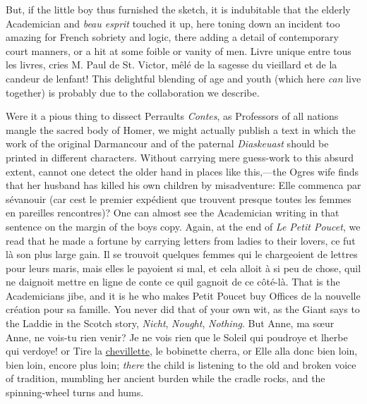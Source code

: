 \documentclass[14pt,a4paper]{memoir}
\newcommand{\ul}[1]{\uline{#1}}
\begin{document}
But, if the little boy thus furnished the sketch, it is indubitable that
the elderly Academician and \emph{beau esprit} touched it up, here
toning down an incident too amazing for French sobriety and logic, there
adding a detail of contemporary court manners, or a hit at some foible
or vanity of men. \textquotesingle Livre unique entre tous les
livres,\textquotesingle{} cries M. Paul de St. Victor,
\textquotesingle mêlé de la sagesse du vieillard et de la candeur de
l\textquotesingle enfant!\textquotesingle{} This delightful blending of
age and youth (which here \emph{can} \textquotesingle live
together\textquotesingle) is probably due to the collaboration we
describe.

Were it a pious thing to dissect Perrault\textquotesingle s
\emph{Contes}, as Professors of all nations mangle the sacred body of
Homer, we might actually publish a text in which the work of the
original Darmancour and of the paternal \emph{Diaskeuast} should be
printed in different characters. Without carrying mere guess-work to
this absurd extent, cannot one detect the older hand in places like
this,---the Ogre\textquotesingle s wife finds that her husband has
killed his own children by misadventure: \textquotesingle Elle commenca
par s\textquotesingle évanouir (car c\textquotesingle est le premier
expédient que trouvent presque toutes les femmes en pareilles
rencontres)\textquotesingle? One can almost see the Academician writing
in that sentence on the margin of the boy\textquotesingle s copy. Again,
at the end of \emph{Le Petit Poucet}, we read that he made a fortune by
carrying letters from ladies to their lovers, \textquotesingle ce fut là
son plus large gain. Il se trouvoit quelques femmes qui le chargeoient
de lettres pour leurs maris, mais elles le payoient si mal, et cela
alloit à si peu de chose, qu\textquotesingle il ne daignoit mettre en
ligne de conte ce qu\textquotesingle il gagnoit de ce
côté-là.\textquotesingle{} That is the Academician\textquotesingle s
jibe, and it is he who makes Petit Poucet buy Offices
\textquotesingle de la nouvelle création pour sa
famille.\textquotesingle{} \textquotesingle You never did that of your
own wit,\textquotesingle{} as the Giant says to the Laddie in the Scotch
story, \emph{Nicht}, \emph{Nought}, \emph{Nothing}. But
\textquotesingle Anne, ma sœur Anne, ne vois-tu rien
venir?\textquotesingle{} \textquotesingle Je ne vois rien que le Soleil
qui poudroye et l\textquotesingle herbe qui verdoye!\textquotesingle{}
or \textquotesingle Tire la \ul{chevillette}, le bobinette
cherra,\textquotesingle{} or \textquotesingle Elle alla donc bien loin,
bien loin, encore plus loin\textquotesingle; \emph{there} the child is
listening to the old and broken voice of tradition, mumbling her ancient
burden while the cradle rocks, and the spinning-wheel turns and hums.
\end{document}
